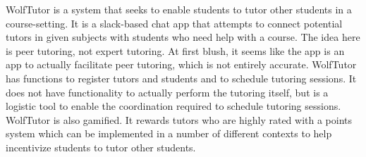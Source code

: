 WolfTutor is a system that seeks to enable students to tutor other
students in a course-setting.  It is a slack-based chat app
that attempts to connect potential tutors in given subjects with
students who need help with a course.  The idea here is peer tutoring,
not expert tutoring.  At first blush, it seems like the app is an app
to actually facilitate peer tutoring, which is not entirely accurate.
WolfTutor has functions to register tutors and students and to
schedule tutoring sessions.  It does not have functionality to
actually perform the tutoring itself, but is a logistic tool to enable
the coordination required to schedule tutoring sessions.  WolfTutor is
also gamified.  It rewards tutors who are highly rated with a points
system which can be implemented in a number of different contexts to
help incentivize students to tutor other students.
